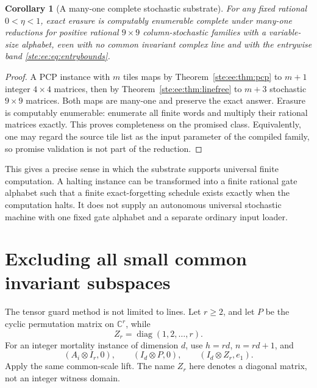 \documentclass[11pt,letterpaper]{article}
\newtheorem{corollary}[theorem]{Corollary}
\theoremstyle{definition}
\theoremstyle{remark}
\newcommand{\C}{\mathbb C}
\DeclareMathOperator{\diag}{diag}
\begin{document}
\begin{corollary}[A many-one complete stochastic substrate]\label{ste:ee:cor:complete}
For any fixed rational $0<\eta<1$, exact erasure is computably enumerable complete
under many-one reductions for positive rational $9\times9$ column-stochastic
families with a variable-size alphabet, even with no common invariant complex
line and with the entrywise band \eqref{ste:ee:eq:entrybounds}.
\end{corollary}
\begin{proof}
A PCP instance with $m$ tiles maps by Theorem~\ref{ste:ee:thm:pcp} to $m+1$ integer
$4\times4$ matrices, then by Theorem~\ref{ste:ee:thm:linefree} to $m+3$ stochastic
$9\times9$ matrices. Both maps are many-one and preserve the exact answer.
Erasure is computably enumerable: enumerate all finite words and multiply their
rational matrices exactly. This proves completeness on the promised class.
Equivalently, one may regard the source tile list as the input parameter of the
compiled family, so promise validation is not part of the reduction.
\end{proof}

This gives a precise sense in which the substrate supports universal finite
computation. A halting instance can be transformed into a finite rational gate
alphabet such that a finite exact-forgetting schedule exists exactly when the
computation halts. It does not supply an autonomous universal stochastic machine
with one fixed gate alphabet and a separate ordinary input loader.

\section{Excluding all small common invariant subspaces}
\label{ste:ee:sec:higher}

The tensor guard method is not limited to lines. Let $r\geq2$, and let $P$ be the
cyclic permutation matrix on $\C^r$, while
\[
 Z_r=\diag(1,2,\ldots,r).
\]
For an integer mortality instance of dimension $d$, use $h=rd$, $n=rd+1$, and
\begin{equation}
 (A_i\otimes I_r,0),\qquad (I_d\otimes P,0),\qquad
 (I_d\otimes Z_r,e_1).
 \label{ste:ee:eq:higherpairs}
\end{equation}
Apply the same common-scale lift. The name $Z_r$ here denotes a diagonal matrix,
not an integer witness domain.
\end{document}
